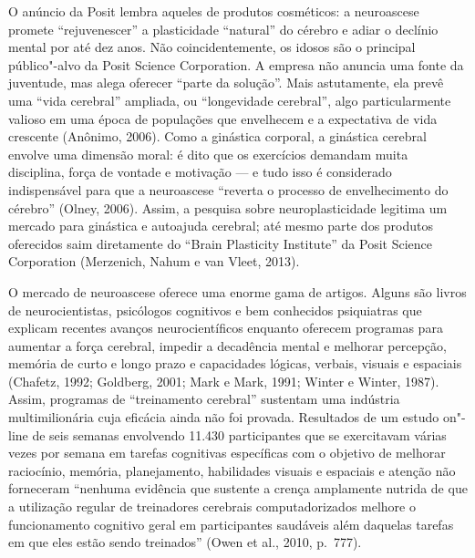 O anúncio da Posit lembra aqueles de produtos cosméticos: a neuroascese
promete ``rejuvenescer'' a plasticidade ``natural'' do cérebro e adiar o
declínio mental por até dez anos. Não coincidentemente, os idosos são o
principal público"-alvo da Posit Science Corporation. A empresa não
anuncia uma fonte da juventude, mas alega oferecer ``parte da solução''.
Mais astutamente, ela prevê uma ``vida cerebral'' ampliada, ou
``longevidade cerebral'', algo particularmente valioso em uma época de
populações que envelhecem e a expectativa de vida crescente (Anônimo,
2006). Como a ginástica corporal, a ginástica cerebral envolve uma
dimensão moral: é dito que os exercícios demandam muita disciplina,
força de vontade e motivação --- e tudo isso é considerado indispensável
para que a neuroascese ``reverta o processo de envelhecimento do
cérebro'' (Olney, 2006). Assim, a pesquisa sobre neuroplasticidade
legitima um mercado para ginástica e autoajuda cerebral; até mesmo parte
dos produtos oferecidos saim diretamente do ``Brain Plasticity
Institute'' da Posit Science Corporation (Merzenich, Nahum e van Vleet,
2013).

O mercado de neuroascese oferece uma enorme gama de artigos. Alguns são
livros de neurocientistas, psicólogos cognitivos e bem conhecidos
psiquiatras que explicam recentes avanços neurocientíficos enquanto
oferecem programas para aumentar a força cerebral, impedir a decadência
mental e melhorar percepção, memória de curto e longo prazo e
capacidades lógicas, verbais, visuais e espaciais (Chafetz, 1992;
Goldberg, 2001; Mark e Mark, 1991; Winter e Winter, 1987). Assim,
programas de ``treinamento cerebral'' sustentam uma indústria
multimilionária cuja eficácia ainda não foi provada. Resultados de um
estudo on"-line de seis semanas envolvendo 11.430 participantes que se
exercitavam várias vezes por semana em tarefas cognitivas específicas
com o objetivo de melhorar raciocínio, memória, planejamento,
habilidades visuais e espaciais e atenção não forneceram ``nenhuma
evidência que sustente a crença amplamente nutrida de que a utilização
regular de treinadores cerebrais computadorizados melhore o
funcionamento cognitivo geral em participantes saudáveis além daquelas
tarefas em que eles estão sendo treinados'' (Owen et al., 2010, p.~777).

